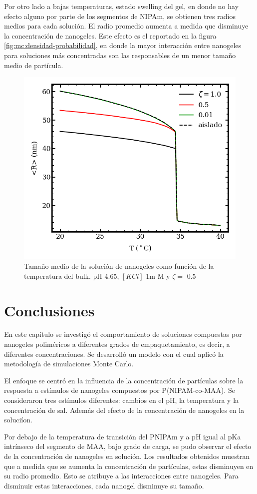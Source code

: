 	Por otro lado a bajas temperaturas, estado swelling del gel, en donde no hay efecto alguno por parte de los segmentos de NIPAm, se obtienen tres radios medios para cada soluci\'on. El radio promedio aumenta a medida que disminuye la concentraci\'on de nanogeles. Este efecto es el reportado en la figura \ref{fig:mc:densidad-probabilidad}, en donde la mayor interacci\'on entre nanogeles para soluciones m\'as concentradas son las responsables de un menor tama\~no medio de part\'icula.
	
	
	
	\begin{figure}[!htb]
		\centering
		\includegraphics[width=0.45\linewidth]{Figures/graph-mc/rvst.png}
		\caption{Tama\~no medio de la soluci\'on de nanogeles como funci\'on de la temperatura del bulk. pH 4.65, $[KCl]$ 1m M y  $\zeta =$ 0.5}
		\label{fig:mc:temperatura-r}
	\end{figure}
	
	\section{Conclusiones}
	En este cap\'itulo se investig\'o el comportamiento de soluciones compuestas por nanogeles polim\'ericos a diferentes grados de empaquetamiento, es decir, a diferentes concentraciones. Se desarroll\'o un modelo con el cual aplic\'o la metodolog\'ia de simulaciones Monte Carlo.
	
	El enfoque se centr\'o en la influencia de la concentraci\'on de part\'iculas sobre la respuesta a est\'imulos de nanogeles compuestos por P(NIPAM-co-MAA). Se consideraron tres est\'imulos diferentes: cambios en el pH, la temperatura y la concentraci\'on de sal. Adem\'as del efecto de la concentraci\'on de nanogeles en la soluci\'ion.
	
	Por debajo de la temperatura de transición del PNIPAm y a pH igual al pKa intr\'inseco del segmento de MAA, bajo grado de carga, se pudo observar el efecto de la concentraci\'on de nanogeles en soluci\'on.
	Los resultados obtenidos muestran que a medida que se aumenta la concentraci\'on de part\'iculas, estas disminuyen en su radio promedio. Esto se atribuye a las interacciones entre nanogeles. Para disminuir estas interacciones, cada nanogel disminuye su tama\~no.
	
